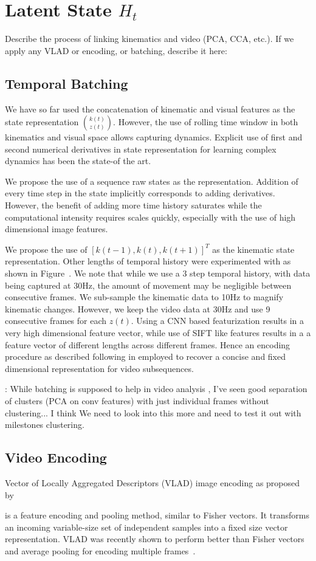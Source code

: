 \section{Latent State $H_t$}
Describe the process of linking kinematics and video (PCA, CCA, etc.).
If we apply any VLAD or encoding, or batching, describe it here:

\subsection{Temporal Batching}
We have so far used the concatenation of kinematic and visual features as the state representation $\binom{k(t)}{z(t)}$. However, the use of rolling time window in both kinematics and visual space allows capturing dynamics. Explicit use of first and second numerical derivatives in state representation for learning complex dynamics has been the state-of the art\tocite. 

We propose the use of a sequence raw states as the representation. Addition of every time step in the state implicitly corresponds to adding derivatives. However, the benefit of adding more time history saturates while the computational intensity requires scales quickly, especially with the use of high dimensional image features. 

We propose the use of $[k(t-1), k(t), k(t+1)]^T$ as the kinematic state representation. Other lengths of temporal history were experimented with as shown in Figure~. We note that while we use a 3 step temporal history, with data being captured at 30Hz, the amount of movement may be negligible between consecutive frames. We sub-sample the kinematic data to 10Hz to magnify kinematic changes. However, we keep the video data at 30Hz and use 9 consecutive frames for each $z(t)$. Using a CNN based featurization results in a very high dimensional feature vector, while use of SIFT like features results in a a feature vector of different lengths across different frames. Hence an encoding procedure as described following in employed to recover a concise and fixed dimensional representation for video subsequences. 

: While batching is supposed to help in video analysis , I've seen good separation of clusters (PCA on conv features) with just individual frames without clustering... I think We need to look into this more and need to test it out with milestones clustering.


\subsection{Video Encoding}
Vector of Locally Aggregated Descriptors (VLAD) image encoding as proposed by \cite{arandjelovic2013all} is a feature encoding and pooling method, similar to Fisher vectors. 
It transforms an incoming variable-size set of independent samples into a fixed size vector representation.
VLAD was recently shown to perform better than Fisher vectors and average pooling for encoding multiple frames~\cite{xu2014discriminative}.

